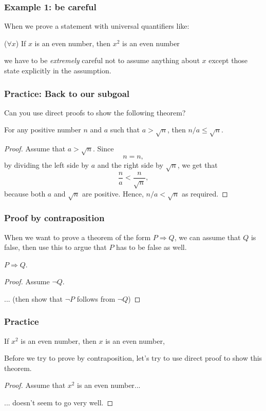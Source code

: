 \begin{frame}\frametitle{Example 1: be careful}
  When we prove a statement with universal quantifiers like:

  \begin{tcolorbox}
    ($\forall x$) If $x$ is an even number, then $x^2$ is an even
    number
  \end{tcolorbox}

  we have to be {\em extremely} careful not to assume anything about
  $x$ except those state explicitly in the assumption.
\end{frame}

\begin{frame}\frametitle{Practice: Back to our subgoal}
  Can you use direct proofs to show the following theorem?

  \begin{theorem}
    For any positive number $n$ and $a$ such that $a > \sqrt{n}$, then
    $n/a\leq\sqrt{n}$.
  \end{theorem} \pause

  \begin{proof}
    Assume that $a > \sqrt{n}$. \pause
    Since
    \[ n = n, \]
    by dividing the left side by $a$ and the right side by $\sqrt{n}$,
    we get that
    \[ \frac{n}{a} < \frac{n}{\sqrt{n}}, \]
    because both $a$ and $\sqrt{n}$ are positive.  Hence, $n/a <
    \sqrt{n}$ as required.
  \end{proof}
\end{frame}

\begin{frame}\frametitle{Proof by contraposition}
  When we want to prove a theorem of the form $P\Rightarrow Q$, we can
  assume that $Q$ is false, then use this to argue that $P$ has to be
  false as well.

  \begin{tcolorbox}[title=Proof by contraposition]
    \begin{theorem}
      $P\Rightarrow Q$.
    \end{theorem}
    \begin{proof}
      Assume $\neg Q$.
      
      ... (then show that $\neg P$ follows from $\neg Q$)
    \end{proof}
  \end{tcolorbox}
\end{frame}

\begin{frame}\frametitle{Practice}
  \begin{theorem}
    If $x^2$ is an even number, then $x$ is an even number, 
  \end{theorem} \pause

  Before we try to prove by contraposition, let's try to use direct
  proof to show this theorem. \pause

  \begin{proof}
    Assume that $x^2$ is an even number...

    \vspace{1.2in} \pause

    ... doesn't seem to go very well.
  \end{proof}
\end{frame}

